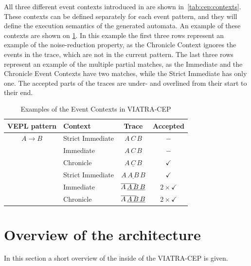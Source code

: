 All three different event contexts introduced in \citep{davidi} are shown in~\cref{tab:cep:contexts}.
These contexts can be defined separately for each event pattern, and they will define the execution semantics of the generated automata. 
An example of these contexts are shown on \cref{tab:cep:contextexample}. In this example the first three rows represent an example of the noise-reduction property, as the Chronicle Context ignores the events in the trace, which are not in the current pattern.
The last three rows represent an example of the multiple partial matches, as the Immediate and the Chronicle Event Contexts have two matches, while the Strict Immediate has only one.
The accepted parts of the traces are under- and overlined from their start to their end.



\begin{table}
	\caption{Examples of the Event Contexts in VIATRA-CEP}		
	\label{tab:cep:contextexample}
	\centering
	\begin{tabular}{@{}clcc@{}}
		\toprule
		VEPL pattern      & Context          & Trace                                                         & Accepted \\
		\midrule
		$A \rightarrow B$ & Strict Immediate & $A\,C\,B$                                                     & $-$ \\[1ex]
		                  & Immediate        & $A\,C\,B$                                                     & $-$ \\[1ex ]
		                  & Chronicle        & $\underline{A\,C\,B}$                                         & $\checkmark$ \\[4ex]
		                  & Strict Immediate & $A\,\underline{A\,B}\,B$                                      & $\checkmark$ \\[1ex]
	                      & Immediate        & $\mathrlap{\overline{\phantom{AAB}}} A\, \underline{A\,B\,B}$ & $2\times\checkmark$ \\[1ex]
		                  & Chronicle        & $\mathrlap{\overline{\phantom{AAB}}} A\, \underline{A\,B\,B}$ & $2\times\checkmark$ \\[1ex]
		\bottomrule
	\end{tabular}
\end{table}



\section{Overview of the architecture}
In this section a short overview of the inside of the VIATRA-CEP is given.

